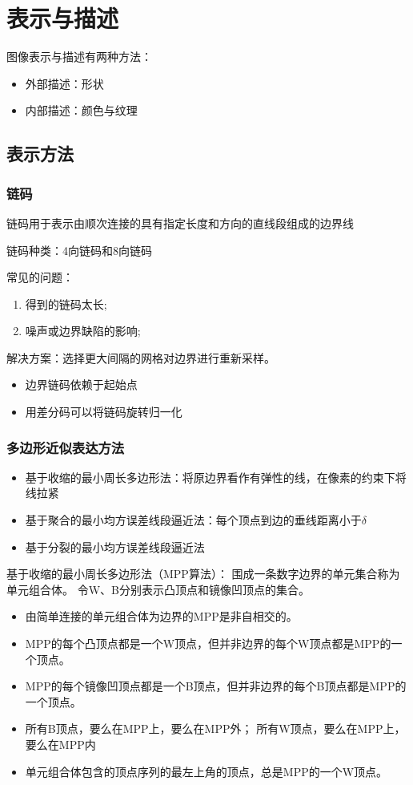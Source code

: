
\section{表示与描述}
图像表示与描述有两种方法：
\begin{itemize}
	\item 外部描述：形状
	\item 内部描述：颜色与纹理
\end{itemize}

\subsection{表示方法}
\subsubsection{链码}
链码用于表示由顺次连接的具有指定长度和方向的直线段组成的边界线

链码种类：4向链码和8向链码

常见的问题：
\begin{enumerate}
\item 得到的链码太长;
\item 噪声或边界缺陷的影响;
\end{enumerate}

解决方案：选择更大间隔的网格对边界进行重新采样。
\begin{itemize}
\item 边界链码依赖于起始点
\item 用差分码可以将链码旋转归一化
\end{itemize}

\subsubsection{多边形近似表达方法}
\begin{itemize}
	\item 基于收缩的最小周长多边形法：将原边界看作有弹性的线，在像素的约束下将线拉紧
	\item 基于聚合的最小均方误差线段逼近法：每个顶点到边的垂线距离小于$\delta$
	\item 基于分裂的最小均方误差线段逼近法
\end{itemize}

基于收缩的最小周长多边形法（MPP算法）：
围成一条数字边界的单元集合称为单元组合体。
令W、B分别表示凸顶点和镜像凹顶点的集合。
\begin{itemize}
	\item 由简单连接的单元组合体为边界的MPP是非自相交的。
	\item MPP的每个凸顶点都是一个W顶点，但并非边界的每个W顶点都是MPP的一个顶点。
	\item MPP的每个镜像凹顶点都是一个B顶点，但并非边界的每个B顶点都是MPP的一个顶点。
	\item 所有B顶点，要么在MPP上，要么在MPP外；
	所有W顶点，要么在MPP上，要么在MPP内
	\item 单元组合体包含的顶点序列的最左上角的顶点，总是MPP的一个W顶点。
\end{itemize}

